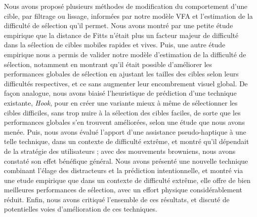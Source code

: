 	Nous avons proposé plusieurs méthodes de modification du comportement d'une cible, par filtrage ou lissage, informées par notre modèle VFA et l'estimation de la difficulté de sélection qu'il permet. Nous avons montré par une petite étude empirique que la distance de Fitts n'était plus un facteur majeur de difficulté dans la sélection de cibles mobiles rapides et vives. Puis, une autre étude empirique nous a permis de valider notre modèle d'estimation de la difficulté de sélection, notamment en montrant qu'il était possible d'améliorer les performances globales de sélection en ajustant les tailles des cibles selon leurs difficultés respectives, et ce sans augmenter leur encombrement visuel global. De façon analogue, nous avons biaisé l'heuristique de prédiction d'une technique existante, \emph{Hook}, pour en créer une variante mieux à même de sélectionner les cibles difficiles, sans trop nuire à la sélection des cibles faciles, de sorte que les performances globales s'en trouvent améliorées, selon une étude que nous avons menée. Puis, nous avons évalué l'apport d'une assistance pseudo-haptique à une telle technique, dans un contexte de difficulté extrême, et montré qu'il dépendait de la stratégie des utilisateurs ; avec des mouvements browniens, nous avons constaté son effet bénéfique général. Nous avons présenté une nouvelle technique combinant l'élage des distracteurs et la prédiction intentionnelle, et montré via une etude empirique que dans un contexte de difficulté extrême, elle offre de bien meilleures performances de sélection, avec un effort physique considérablement réduit. Enfin, nous avons critiqué l'ensemble de ces résultats, et discuté de potentielles voies d'amélioration de ces techniques.
	
